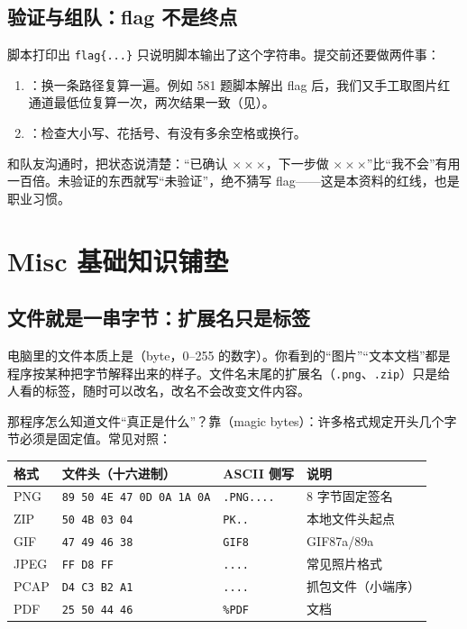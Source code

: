 \documentclass[UTF8,12pt,oneside]{ctexbook}
\begin{document}
\section{验证与组队：flag 不是终点}
脚本打印出 \verb|flag{...}| 只说明脚本输出了这个字符串。提交前还要做两件事：
\begin{enumerate}[label=\arabic*.]
\item {}：换一条路径复算一遍。例如 581 题脚本解出 flag 后，我们又手工取图片红通道最低位复算一次，两次结果一致（见）。
\item {}：检查大小写、花括号、有没有多余空格或换行。
\end{enumerate}
和队友沟通时，把状态说清楚：“已确认 $\times\times\times$，下一步做 $\times\times\times$”比“我不会”有用一百倍。未验证的东西就写“未验证”，绝不猜写 flag——这是本资料的红线，也是职业习惯。

\chapter{Misc 基础知识铺垫}
\label{chap:knowledge}

\section{文件就是一串字节：扩展名只是标签}
电脑里的文件本质上是（byte，0--255 的数字）。你看到的“图片”“文本文档”都是程序按某种把字节解释出来的样子。文件名末尾的扩展名（\verb|.png|、\verb|.zip|）只是给人看的标签，随时可以改名，改名不会改变文件内容。

那程序怎么知道文件“真正是什么”？靠（magic bytes）：许多格式规定开头几个字节必须是固定值。常见对照：

\begin{center}
\begin{tabular}{llll}
\toprule
格式 & 文件头（十六进制） & ASCII 侧写 & 说明 \\
\midrule
PNG & \texttt{89 50 4E 47 0D 0A 1A 0A} & \texttt{.PNG....} & 8 字节固定签名 \\
ZIP & \texttt{50 4B 03 04} & \texttt{PK..} & 本地文件头起点 \\
GIF & \texttt{47 49 46 38} & \texttt{GIF8} & GIF87a/89a \\
JPEG & \texttt{FF D8 FF} & \texttt{....} & 常见照片格式 \\
PCAP & \texttt{D4 C3 B2 A1} & \texttt{....} & 抓包文件（小端序） \\
PDF & \texttt{25 50 44 46} & \texttt{\%PDF} & 文档 \\
\bottomrule
\end{tabular}
\end{center}
\end{document}
